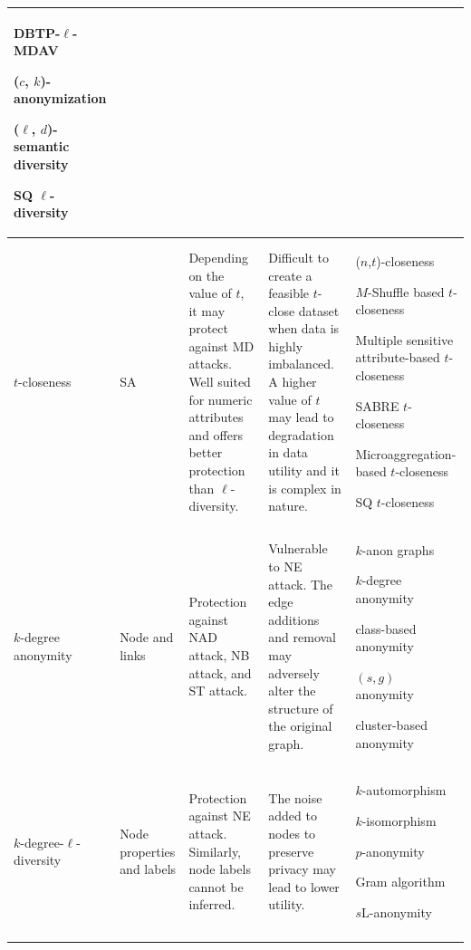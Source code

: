 \documentclass{bioinfo}
\begin{document}
\begin{table}
\begin{center}
\begin{tabular}{p{1.5cm}p{2cm}p{4cm}p{5cm}p{4cm}}
DBTP-$\ell$-MDAV \cite{wu2019micro}

($c$, $k$)-anonymization \cite{xiao2020privacy}

($\ell$, $d$)-semantic diversity \cite{oishi2020semantic}

SQ $\ell$-diversity \cite{sei2017anonymization} \\

\midrule
$t$-closeness & SA & Depending on the value of $t$, it may protect against MD attacks. Well suited for numeric attributes and offers better protection than $\ell$-diversity. & Difficult to create a feasible $t$-close dataset when data is highly imbalanced. A higher value of $t$ may lead to degradation in data utility and it is complex in nature. & ($n$,$t$)-closeness \cite{li2009closeness}

$M$-Shuffle based $t$-closeness \cite{qu2017privacy}

Multiple sensitive attribute-based $t$-closeness \cite{wang2018privacy}

SABRE $t$-closeness \cite{cao2011sabre}

Microaggregation-based $t$-closeness \cite{soria2015t}

SQ $t$-closeness \cite{sei2017anonymization} \\
\midrule
$k$-degree anonymity & Node and links & Protection against NAD attack, NB attack, and ST attack. & Vulnerable to NE attack. The edge additions and removal may adversely alter the structure of the original graph.  & $k$-anon graphs \cite{cite518zhou2008preserving}

$k$-degree anonymity \cite{cite58liu2008towards}

class-based anonymity \cite{bhagat2009class}

$(s,g)$ anonymity \cite{hay2008resisting}

cluster-based anonymity \cite{thompson2009union} \\
\midrule
$k$-degree-$\ell$-diversity & Node properties and labels & Protection against NE attack. Similarly, node labels cannot be inferred.  & The noise added to nodes to preserve privacy may lead to lower utility.  & $k$-automorphism \cite{cite5zou2009k}

$k$-isomorphism \cite{cite5cheng2010k}

$p$-anonymity \cite{cite5yuan2010personalized}

Gram algorithm \cite{mortazavi2020gram}

$s$L-anonymity \cite{foffano2019you} \\

\botrule
\end{tabular}
\end{center}
\end{table}
\end{document}
